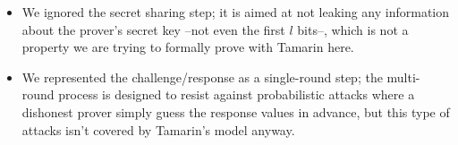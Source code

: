 \begin{itemize}
	\item We ignored the secret sharing step; it is aimed at not leaking any information about the prover's secret key --not even the first $l$ bits--, which is not a property we are trying to formally prove with Tamarin here. 
	\item We represented the challenge/response as a single-round step; the multi-round process is designed to resist against probabilistic attacks where a dishonest prover simply guess the response values in advance, but this type of attacks isn't covered by Tamarin's model anyway.
\end{itemize}



